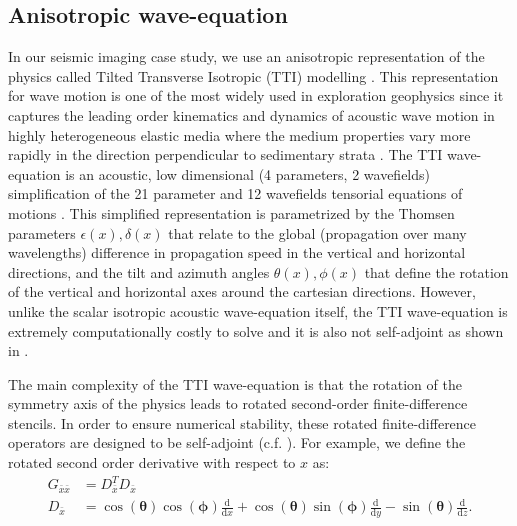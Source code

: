 \documentclass[10pt, conference]{IEEEtran}
\begin{document}
\subsection{Anisotropic wave-equation}\label{anisotropic-wave-equation}

In our seismic imaging case study, we use an anisotropic representation of the
physics called Tilted Transverse Isotropic (TTI) modelling \cite{thomsen1986}. This
representation for wave motion is one of the most widely used in exploration
geophysics since it captures the leading order kinematics and dynamics of
acoustic wave motion in highly heterogeneous elastic media where the medium
properties vary more rapidly in the direction perpendicular to sedimentary
strata \cite{alkhalifah2000, baysal1983, bubetti2012, bubetti2014,
bubesatti2016, chu2011, duveneck, fletcher, fowlertti2010,
louboutin2018segeow, whitmore1983, witte2016segpve, xu2014, zhang2005,
zhang2011, zhan2013}. The TTI wave-equation is an acoustic, low dimensional (4
parameters, 2 wavefields) simplification of the 21 parameter and 12 wavefields
tensorial equations of motions \cite{hooke}. This simplified representation is
parametrized by the Thomsen parameters $\epsilon(x), \delta(x)$ that relate to
the global (propagation over many wavelengths) difference in propagation speed
in the vertical and horizontal directions, and the tilt and azimuth angles
$\theta(x), \phi(x)$ that define the rotation of the vertical and horizontal
axes around the cartesian directions. However, unlike the scalar isotropic
acoustic wave-equation itself, the TTI wave-equation is extremely
computationally costly to solve and it is also not self-adjoint as shown in
\cite{louboutin2018segeow}.

The main complexity of the TTI wave-equation is that the rotation of the
symmetry axis of the physics leads to rotated second-order finite-difference
stencils. In order to ensure numerical stability, these rotated
finite-difference operators are designed to be self-adjoint (c.f.
\cite{zhang2011, duveneck}). For example, we define the rotated second order
derivative with respect to $x$ as:
%
\begin{equation}
\begin{aligned}
  G_{\bar{x}\bar{x}} &= D_{\bar{x}}^T D_{\bar{x}} \\
  D_{\bar{x}} &= \cos(\mathbf{\theta})\cos(\mathbf{\phi})\frac{\mathrm{d}}{\mathrm{d}x} + \cos(\mathbf{\theta})\sin(\mathbf{\phi})\frac{\mathrm{d}}{\mathrm{d}y} - \sin(\mathbf{\theta})\frac{\mathrm{d}}{\mathrm{d}z}.
\end{aligned}
\label{rot}
\end{equation}
%
\end{document}
